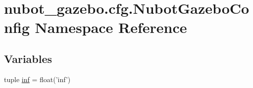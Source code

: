 \hypertarget{namespacenubot__gazebo_1_1cfg_1_1NubotGazeboConfig}{\section{nubot\-\_\-gazebo.\-cfg.\-Nubot\-Gazebo\-Config Namespace Reference}
\label{namespacenubot__gazebo_1_1cfg_1_1NubotGazeboConfig}
}
\subsection*{Variables}
\begin{DoxyCompactItemize}
\item 
tuple \hyperlink{namespacenubot__gazebo_1_1cfg_1_1NubotGazeboConfig_ac70a4d003ebcffef0f76f63f40bcf1c1}{inf} = float('inf')
\item 

\end{DoxyCompactItemize}
